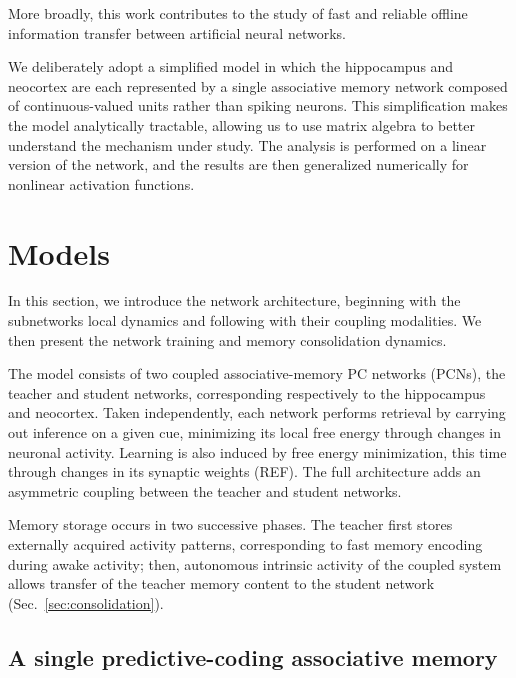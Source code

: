 \documentclass[10pt,letterpaper]{article}
\theoremstyle{plain}
\theoremstyle{remark}
\begin{document}
More broadly, this work contributes to the study of fast and reliable offline information transfer between artificial neural networks.

We deliberately adopt a simplified model in which the hippocampus and neocortex are each represented by a single associative memory network composed of continuous-valued units rather than spiking neurons. This simplification makes the model analytically tractable, allowing us to use matrix algebra to better understand the mechanism under study.
The analysis is performed on a linear version of the network, and the results are then generalized numerically for nonlinear activation functions.

\newpage


\section{Models}

In this section, we introduce the network architecture, beginning with the subnetworks local dynamics and following with their coupling modalities.
We then present the network training and memory consolidation dynamics.

The model consists of two coupled associative-memory PC networks (PCNs), the teacher and student networks, corresponding respectively to the hippocampus and neocortex. Taken independently, each network performs retrieval by carrying out inference on a given cue, minimizing its local free energy through changes in neuronal activity. Learning is also induced  by free energy minimization, this time through changes in its synaptic weights (REF). The full architecture adds an asymmetric coupling between the teacher and student networks.

Memory storage occurs in two successive phases. The teacher first stores externally acquired activity patterns, corresponding to fast memory encoding during awake activity; then, autonomous intrinsic activity of the coupled system allows transfer of the teacher memory content to the student network (Sec.~\ref{sec:consolidation}).



\subsection{A single predictive-coding associative memory}
\end{document}
